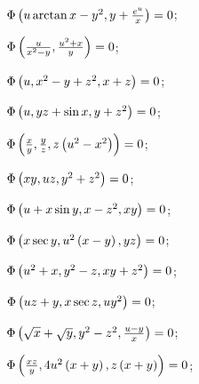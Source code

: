 \begin{enumsols}
		\label{sol:nonlinsys_quazilinear:dim2_hard}
		\item \( \Phi \left( u \arctan{x} - y^2, y + \frac{e^u}{x} \right) = 0 \); \sfill %
		\item \( \Phi \left( \frac{u}{x^{2} - y}, \frac{u^{2} + x}{y} \right) = 0 \); \sfill %

		\label{sol:nonlinsys_quazilinear:dim3}
		\item \( \Phi \left( u, x^2 - y + z^2, x + z \right) = 0 \); \sfill %
		\item \( \Phi \left( u, yz + \sin{x}, y + z^2 \right) = 0 \); \sfill %
		\item \( \Phi \left( \frac{x}{y}, \frac{y}{z}, z \left( u^2 - x^2 \right) \right) = 0 \); \sfill %
		\item \( \Phi \left( xy, uz, y^2 + z^2 \right) = 0 \); \sfill %
		\item \( \Phi \left( u + x \sin{y}, x - z^2, xy \right) = 0 \); \sfill %
		\item \( \Phi \left( x \sec{y}, u^2 \left( x - y \right), yz \right) = 0 \); \sfill %
		\item \( \Phi \left( u^2 + x, y^2 - z, xy + z^2 \right) = 0 \); \sfill %
		\item \( \Phi \left( uz + y, x \sec{z}, u y^2 \right) = 0 \); \sfill %
		\item \( \Phi \left( \sqrt{x} + \sqrt{y}, y^2 - z^2, \frac{u - y}{x} \right) = 0 \); \sfill %
		\item \( \Phi \left( \frac{x z}{y}, 4u^2 \left( x + y \right), z \left( x + y \right) \right) = 0 \); \sfill %
		

\end{enumsols}
